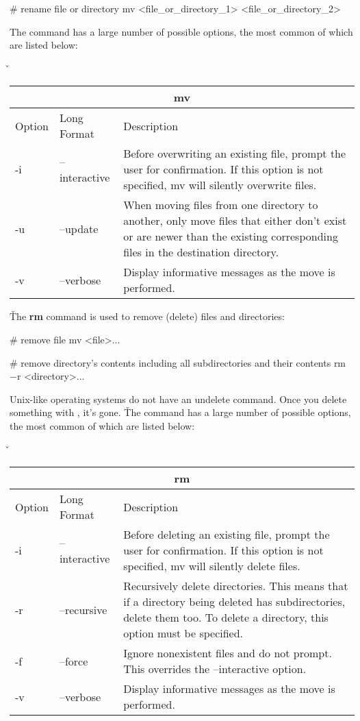 \begin{bash}
# rename file or directory
mv <file_or_directory_1> <file_or_directory_2>
\end{bash}

The  command has a large number of possible options, the most common of which are listed below:

\v

\begin{tabular}{ |p{1cm}|p{3cm}||p{10.6cm}| }
\hline
\multicolumn{3}{|c|}{mv} \\
\hline
Option& Long Format& Description\\
\hline
-i & --interactive & Before overwriting an existing file, prompt the user for confirmation. If this option is not specified, mv will silently overwrite files.\\
-u & --update & When moving files from one directory to another, only move files that either don't exist or are newer than the existing corresponding files in the destination directory.\\
-v & --verbose & Display informative messages as the move is performed.\\
\hline
\end{tabular}

\v

The \textbf{rm} command is used to remove (delete) files and directories:
\begin{bash}
# remove file
mv <file>...
\end{bash}

\begin{bash}
# remove directory's contents including all subdirectories and their contents
rm $-$r <directory>...
\end{bash}

Unix-like operating systems do not have an undelete command. Once you delete something with , it's gone. \v

The  command has a large number of possible options, the most common of which are listed below:

\v

\begin{tabular}{ |p{1cm}|p{3cm}||p{10.6cm}| }
\hline
\multicolumn{3}{|c|}{rm} \\
\hline
Option& Long Format& Description\\
\hline
-i & --interactive & Before deleting an existing file, prompt the user for confirmation. If this option is not specified, mv will silently delete files.\\
-r & --recursive & Recursively delete directories. This means that if a directory being deleted has subdirectories, delete them too. To delete a directory, this option must be specified.\\
-f & --force & Ignore nonexistent files and do not prompt. This overrides the --interactive option.\\
-v & --verbose & Display informative messages as the move is performed.\\
\hline
\end{tabular}

